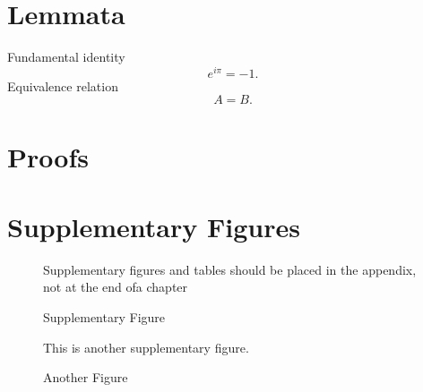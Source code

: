 \begin{appendices}

\chapter{Lemmata}
Fundamental identity
\begin{equation}
  \label{eq:A}
  e^{i\pi}=-1.
\end{equation}
Equivalence relation
\begin{equation}
  \label{eq:B}
  A=B.
\end{equation}

\chapter{Proofs}

\chapter{Supplementary Figures}

\begin{figure}[ht]
  \centering Supplementary figures and tables should be placed in the appendix,
  not at the end ofa chapter
  \caption{Supplementary Figure}
  \label{fig:figuresup1}
\end{figure}

\begin{figure}[ht]
  \centering
  This is another supplementary figure.
  \caption{Another Figure}
  \label{fig:figuresup3}
\end{figure}


\end{appendices}
